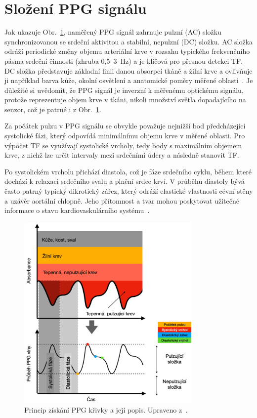 \section{Složení \acs{PPG} signálu}

Jak ukazuje Obr.~\ref{fig:signalPPG}, naměřený \acs{PPG} signál zahrnuje pulzní (AC) složku synchronizovanou se srdeční aktivitou a stabilní, nepulzní (DC) složku.
AC složka odráží periodické změny objemu arteriální krve v rozsahu typického frekvenčního pásma srdeční činnosti (zhruba 0,5--3~Hz) a je klíčová pro přesnou detekci \acs{TF}.
DC složka představuje základní linii danou absorpcí tkáně a žilní krve a ovlivňuje ji například barva kůže, okolní osvětlení a anatomické poměry měřené oblasti~\cite{ENIKÖ, Park2022}.
Je důležité si uvědomit, že \acs{PPG} signál je inverzní k měřenému optickému signálu, protože reprezentuje objem krve v tkáni, nikoli množství světla dopadajícího na senzor, což je patrné i z Obr.~\ref{fig:signalPPG}.

Za počátek pulzu v \acs{PPG} signálu se obvykle považuje nejnižší bod předcházející systolické fázi, který odpovídá minimálnímu objemu krve v měřené oblasti.
Pro výpočet \acs{TF} se využívají systolické vrcholy, tedy body s maximálním objemem krve, z nichž lze určit intervaly mezi srdečními údery a následně stanovit \acs{TF}.

Po systolickém vrcholu přichází diastola, což je fáze srdečního cyklu, během které dochází k relaxaci srdečního svalu a plnění srdce krví.
V průběhu diastoly bývá často patrný typický dikrotický zářez, který odráží elastické vlastnosti cévní stěny a uzávěr aortální chlopně.
Jeho přítomnost a tvar mohou poskytovat užitečné informace o stavu kardiovaskulárního systému~\cite{Orphanidou2018, Park2022}.

\begin{figure}[hb]
	\centering
	\includegraphics[width=0.8\textwidth]{./obrazky/signalPPG.png}
	\caption[Fiziologický popis PPG signálu]{Princip získání \acs{PPG} křivky a její popis. Upraveno z~\cite{Park2022}.}
	\label{fig:signalPPG}
\end{figure}